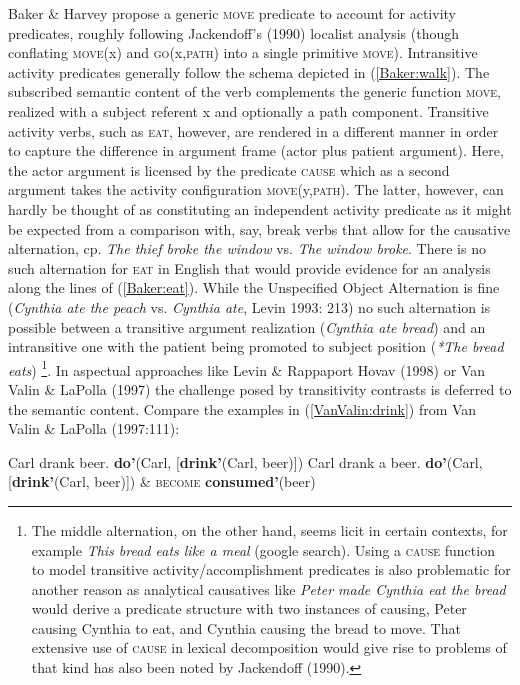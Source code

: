 Baker \& Harvey propose a generic \textsc{move} predicate to account for activity predicates, roughly following Jackendoff's (1990) localist analysis (though conflating \textsc{move}(x) and \textsc{go}(x,\textsc{path}) into a single primitive \textsc{move}). Intransitive activity predicates generally follow the schema depicted in (\ref{Baker:walk}). The subscribed semantic content of the verb complements the generic function \textsc{move}, realized with a subject referent x and optionally a path component. Transitive activity verbs, such as \textsc{eat}, however, are rendered in a different manner in order to capture the difference in argument frame (actor plus patient argument). Here, the actor argument is licensed by the predicate \textsc{cause} which as a second argument takes the activity configuration \textsc{move}(y,\textsc{path}). The latter, however, can hardly be thought of as constituting an independent activity predicate as it might be expected from a comparison with, say, break verbs that allow for the causative alternation, cp. \textit{The thief broke the window} vs. \textit{The window broke}. There is no such alternation for \textsc{eat} in English that would provide evidence for an analysis along the lines of (\ref{Baker:eat}). While the Unspecified Object Alternation is fine (\textit{Cynthia ate the peach} vs. \textit{Cynthia ate}, Levin 1993: 213) no such alternation is possible between a transitive argument realization (\textit{Cynthia ate bread}) and an intransitive one with the patient being promoted to subject position (\textit{*The bread eats})
\footnote{The middle alternation, on the other hand, seems licit in certain contexts, for example \textit{This bread eats like a meal} (google search). Using a \textsc{cause} function to model transitive activity/accomplishment predicates is also problematic for another reason as analytical causatives like \textit{Peter made Cynthia eat the bread} would derive a predicate structure with two instances of causing, Peter causing Cynthia to eat, and Cynthia causing the bread to move. That extensive use of \textsc{cause} in lexical decomposition would give rise to problems of that kind has also been noted by Jackendoff (1990).}. In aspectual approaches like Levin \& Rappaport Hovav (1998) or Van Valin \& LaPolla (1997) the challenge posed by transitivity contrasts is deferred to the semantic content. Compare the examples in (\ref{VanValin:drink}) from Van Valin \& LaPolla (1997:111):

\ea \label{VanValin:drink}
\ea Carl drank beer. \label{VanValin:drinka}
 \textbf{do'}(Carl, [\textbf{drink'}(Carl, beer)])
\ex Carl drank a beer. \label{VanValin:drinkb}
 \textbf{do'}(Carl, [\textbf{drink'}(Carl, beer)]) \& \textsc{become} \textbf{consumed'}(beer)
\z
\z

